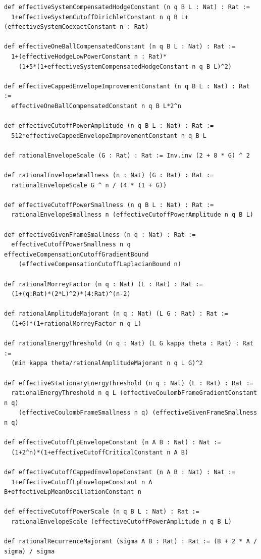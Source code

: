 \documentclass[11pt,a4paper]{article}
\numberwithin{equation}{section}
\theoremstyle{definition}
\theoremstyle{remark}
\begin{document}
\begin{lstlisting}
def effectiveSystemCompensatedHodgeConstant (n q B L : Nat) : Rat :=
  1+effectiveSystemCutoffDirichletConstant n q B L+(effectiveSystemCoexactConstant n : Rat)

def effectiveOneBallCompensatedConstant (n q B L : Nat) : Rat :=
  1+(effectiveHodgeLowPowerConstant n : Rat)*
    (1+5*(1+effectiveSystemCompensatedHodgeConstant n q B L)^2)

def effectiveCappedEnvelopeImprovementConstant (n q B L : Nat) : Rat :=
  effectiveOneBallCompensatedConstant n q B L*2^n

def effectiveCutoffPowerAmplitude (n q B L : Nat) : Rat :=
  512*effectiveCappedEnvelopeImprovementConstant n q B L

def rationalEnvelopeScale (G : Rat) : Rat := Inv.inv (2 + 8 * G) ^ 2

def rationalEnvelopeSmallness (n : Nat) (G : Rat) : Rat :=
  rationalEnvelopeScale G ^ n / (4 * (1 + G))

def effectiveCutoffPowerSmallness (n q B L : Nat) : Rat :=
  rationalEnvelopeSmallness n (effectiveCutoffPowerAmplitude n q B L)

def effectiveGivenFrameSmallness (n q : Nat) : Rat :=
  effectiveCutoffPowerSmallness n q effectiveCompensationCutoffGradientBound
    (effectiveCompensationCutoffLaplacianBound n)

def rationalMorreyFactor (n q : Nat) (L : Rat) : Rat :=
  (1+(q:Rat)*(2*L)^2)*(4:Rat)^(n-2)

def rationalAmplitudeMajorant (n q : Nat) (L G : Rat) : Rat :=
  (1+G)*(1+rationalMorreyFactor n q L)

def rationalEnergyThreshold (n q : Nat) (L G kappa theta : Rat) : Rat :=
  (min kappa theta/rationalAmplitudeMajorant n q L G)^2

def effectiveStationaryEnergyThreshold (n q : Nat) (L : Rat) : Rat :=
  rationalEnergyThreshold n q L (effectiveCoulombFrameGradientConstant n q)
    (effectiveCoulombFrameSmallness n q) (effectiveGivenFrameSmallness n q)

def effectiveCutoffLpEnvelopeConstant (n A B : Nat) : Nat :=
  (1+2^n)*(1+effectiveCutoffCriticalConstant n A B)

def effectiveCutoffCappedEnvelopeConstant (n A B : Nat) : Nat :=
  1+effectiveCutoffLpEnvelopeConstant n A B+effectiveLpMeanOscillationConstant n

def effectiveCutoffPowerScale (n q B L : Nat) : Rat :=
  rationalEnvelopeScale (effectiveCutoffPowerAmplitude n q B L)

def rationalRecurrenceMajorant (sigma A B : Rat) : Rat := (B + 2 * A / sigma) / sigma


\end{lstlisting}
\end{document}
